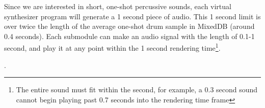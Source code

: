 \documentclass[\main/thesis.tex]{subfiles}
\begin{document}
Since we are interested in short, one-shot percussive sounds, each virtual synthesizer program will generate a 1 second piece of audio. This 1 second limit is over twice the length of the average one-shot drum sample in MixedDB (around 0.4 seconds). Each submodule can make an audio signal with the length of 0.1-1 second, and play it at any point within the 1 second rendering time\footnote{The entire sound must fit within the second, for example, a 0.3 second sound cannot begin playing past 0.7 seconds into the rendering time frame}.
\begin{table}[t!]
\centering
{}
\caption{Synthesizer submodule parameters. Despite the simplicity of the parameters and efforts at constraining the ranges, the combinations of parameters that can be randomly chosen for each submodule is in the order of $10^{15}$ }.
\label{table:submodule_params}
\end{table}
\end{document}
